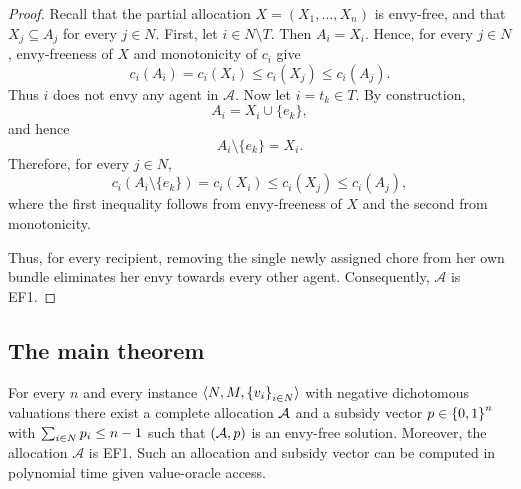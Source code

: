 \begin{proof}
Recall that the partial allocation
$X=(X_1,\ldots,X_n)$ is envy-free, and that
$X_j\subseteq A_j$ for every $j\in N$. First, let $i\in N\setminus T$. Then $A_i=X_i$. Hence, for every
$j\in N$, envy-freeness of $X$ and monotonicity of $c_i$ give
\[
c_i(A_i)
=
c_i(X_i)
\le
c_i(X_j)
\le
c_i(A_j).
\]
Thus $i$ does not envy any agent in $\mathcal{A}$. Now let $i=t_k\in T$. By construction,
\[
A_i=X_i\cup\{e_k\},
\]
and hence
\[
A_i\setminus\{e_k\}=X_i.
\]
Therefore, for every $j\in N$,
\[
c_i(A_i\setminus\{e_k\})
=
c_i(X_i)
\le
c_i(X_j)
\le
c_i(A_j),
\]
where the first inequality follows from envy-freeness of $X$ and the
second from monotonicity.

Thus, for every recipient, removing the single newly assigned chore
from her own bundle eliminates her envy towards every other agent.
Consequently, $\mathcal{A}$ is EF1.
\end{proof}
\subsection{The main theorem}
\label{sec:m-main}

\begin{theorem}
\label{thm:m-main}
For every $n$ and every instance $\langle N, M,
\left\{v_i\right\}_{i \in N} \rangle$ with negative dichotomous valuations there
exist a complete allocation $\mathcal{A}$ and a subsidy vector
$p \in \left\{0,1\right\}^n$ with $\sum_{i \in N} p_i \le n-1$ such
that $(\mathcal{A},p)$ is an envy-free solution. Moreover, the allocation $\mathcal{A}$ is EF1. Such an allocation and subsidy vector can be computed in polynomial time given value-oracle access.
\end{theorem}

